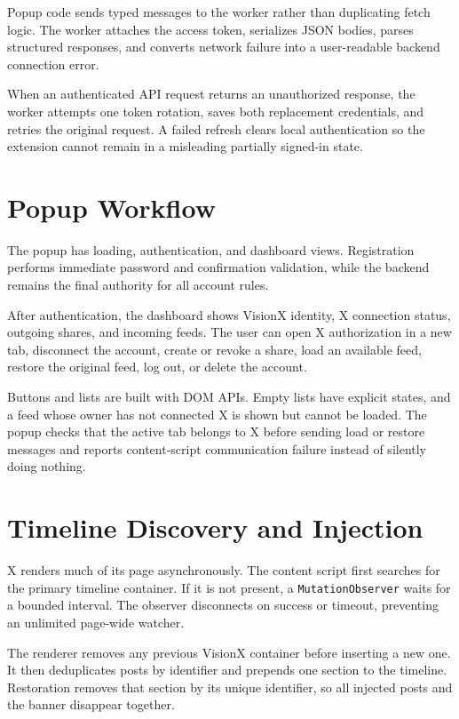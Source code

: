 \documentclass[11pt,a4paper]{report}
\newcommand{\code}[1]{\texttt{#1}}
\begin{document}
Popup code sends typed messages to the worker rather than duplicating fetch
logic. The worker attaches the access token, serializes JSON bodies, parses
structured responses, and converts network failure into a user-readable
backend connection error.

When an authenticated API request returns an unauthorized response, the worker
attempts one token rotation, saves both replacement credentials, and retries
the original request. A failed refresh clears local authentication so the
extension cannot remain in a misleading partially signed-in state.

\section{Popup Workflow}
The popup has loading, authentication, and dashboard views. Registration
performs immediate password and confirmation validation, while the backend
remains the final authority for all account rules.

After authentication, the dashboard shows VisionX identity, X connection
status, outgoing shares, and incoming feeds. The user can open X authorization
in a new tab, disconnect the account, create or revoke a share, load an
available feed, restore the original feed, log out, or delete the account.

Buttons and lists are built with DOM APIs. Empty lists have explicit states,
and a feed whose owner has not connected X is shown but cannot be loaded. The
popup checks that the active tab belongs to X before sending load or restore
messages and reports content-script communication failure instead of silently
doing nothing.

\section{Timeline Discovery and Injection}
X renders much of its page asynchronously. The content script first searches
for the primary timeline container. If it is not present, a
\code{MutationObserver} waits for a bounded interval. The observer disconnects
on success or timeout, preventing an unlimited page-wide watcher.

The renderer removes any previous VisionX container before inserting a new
one. It then deduplicates posts by identifier and prepends one section to the
timeline. Restoration removes that section by its unique identifier, so all
injected posts and the banner disappear together.
\end{document}
